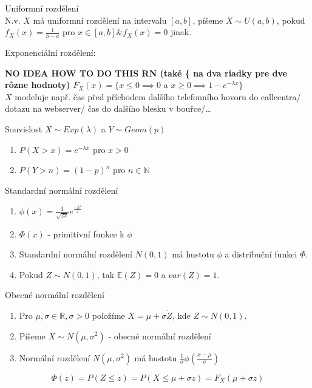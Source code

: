 \documentclass[../main.tex]{subfiles}
\begin{document}
\begin{definition}
    Uniformní rozdělení\\

    N.v. $X$ má uniformní rozdělení na intervalu $[a,b]$, píšeme 
    $X \sim U(a,b)$, pokud $f_X(x) = \frac{1}{b-a}$ pro $x \in [a,b] \& f_X(x) = 0$ jinak.
\end{definition}
\begin{definition}
    Exponenciální rozdělení:

    \textbf{NO IDEA HOW TO DO THIS RN (také \{ na dva riadky pre dve rôzne hodnoty)}
    $F_X(x) = \{ x\leq 0 \implies 0$ a $x \geq 0 \implies 1-e^{-\lambda x}\}$\\
    $X$ modeluje např. čas před příchodem dalšího telefonního hovoru do callcentra/ dotazu na webserver/
    čas do dalšího blesku v bouřce/\dots
\end{definition}

\begin{remark}
    Souvislost $X \sim Exp(\lambda)$ a  $Y \sim Geom(p)$\\
\begin{enumerate}
    \item $P(X > x) = e^{-\lambda x}$ pro $x > 0$
    \item $P(Y > n) = (1-p)^n$ pro $n \in \mathbb{N}$
\end{enumerate}
\end{remark}

\begin{definition}
    Standardní normální rozdělení\\

    \begin{enumerate}
        \item $\phi(x) = \frac{1}{\sqrt{2\pi}}e^{\frac{-x^2}{2}}$
        \item $\Phi(x)$ - primitivní funkce k $\phi$
        \item Standardní normální rozdělení $N(0,1)$ má hustotu $\phi$ a distribuční funkci $\Phi$.
        \item Pokud $Z \sim N(0,1)$, tak $\mathbb{E}(Z) = 0$ a $var(Z) = 1$.
    \end{enumerate}
\end{definition}

\begin{definition}
    Obecné normální rozdělení\\

    \begin{enumerate}
        \item Pro $\mu,\sigma \in \mathbb{R}, \sigma > 0$ položíme $X = \mu + \sigma \dot Z$, kde $Z \sim N(0,1)$.
        \item Píšeme $X \sim N(\mu, \sigma^2)$ - obecné normální rozdělení
        \item Normální rozdělení $N(\mu,\sigma^2)$ má hustotu $\frac{1}{\sigma}\phi \left( \frac{x-\mu}{\sigma} \right)$
    \end{enumerate}

    \[\Phi(z) = P(Z \leq z) = P(X \leq \mu + \sigma z) = F_X(\mu + \sigma z)\]
\end{definition}
\end{document}
